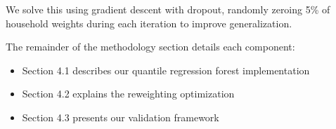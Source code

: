 We solve this using gradient descent with dropout, randomly zeroing 5\% of household weights during each iteration to improve generalization.

The remainder of the methodology section details each component:
\begin{itemize}
    \item Section 4.1 describes our quantile regression forest implementation
    \item Section 4.2 explains the reweighting optimization
    \item Section 4.3 presents our validation framework
\end{itemize}